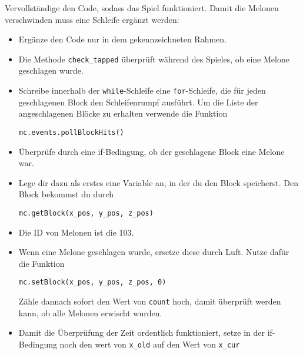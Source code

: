\large Vervollständige den Code, sodass das Spiel funktioniert. Damit die Melonen verschwinden muss eine Schleife ergänzt werden:
\begin{itemize}
	\item Ergänze den Code nur in dem gekennzeichneten Rahmen.
	
	\item Die Methode \texttt{check\_tapped} überprüft während des Spieles, ob eine Melone geschlagen wurde.
	
	\item Schreibe innerhalb der \texttt{while}-Schleife eine \texttt{for}-Schleife, die für jeden geschlagenen Block den Schleifenrumpf ausführt. Um die Liste der angeschlagenen Blöcke zu erhalten verwende die Funktion
	\begin{lstlisting}
mc.events.pollBlockHits()
	\end{lstlisting}
		
	\item Überprüfe durch eine if-Bedingung, ob der geschlagene Block eine Melone war.
	
	\item Lege dir dazu als erstes eine Variable an, in der du den Block speicherst. Den Block bekommst du durch
	\begin{lstlisting}
mc.getBlock(x_pos, y_pos, z_pos)
	\end{lstlisting}
	
	\item Die ID von Melonen ist die 103.
	
	\item Wenn eine Melone geschlagen wurde, ersetze diese durch Luft. Nutze dafür die Funktion
	\begin{lstlisting}
mc.setBlock(x_pos, y_pos, z_pos, 0)
	\end{lstlisting}
	Zähle dannach sofort den Wert von \texttt{count} hoch, damit überprüft werden kann, ob alle Melonen erwischt wurden.
	
	\item Damit die Überprüfung der Zeit ordentlich funktioniert, setze in der if-Bedingung noch den wert von \texttt{x\_old} auf den Wert von \texttt{x\_cur}
\end{itemize}